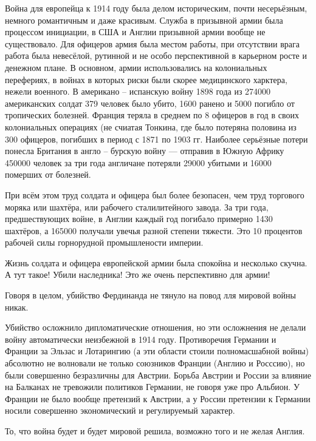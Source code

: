 Война для европейца к 1914 году была делом историческим, почти несерьёзным,
немного романтичным и даже красивым. Служба в призывной армии была процессом
инициации, в США и Англии призывной армии вообще не существовало. Для офицеров
армия была местом работы, при отсутствии врага работа была невесёлой, рутинной
и не особо перспективной в карьерном росте и денежном плане. В основном, армии
использовались на колониальных перефериях, в войнах в которых риски были скорее
медицинского харктера, нежели военного. В американо -- испанскую войну 1898 года
из 274000 американских солдат 379 человек было убито, 1600 ранено и 5000 погибло
от тропических болезней. Франция теряла в среднем по 8 офицеров в год в своих
колониальных операциях (не счиатая Тонкина, где было потеряна половина из 300
офицеров, погибших в период с 1871 по 1903 гг. Наиболее серьёзные потери понесла
Британия в англо -- бурскую войну --- отправив в Южную Африку 450000 человек за
три года англичане потеряли 29000 убитыми и 16000 померших от болезней.

При всём этом труд солдата и офицера был более безопасен, чем труд торгового
моряка или шахтёра, или рабочего сталилитейного завода. За три года,
предшествующих войне, в Англии каждый год погибало примерно 1430 шахтёров, а
165000 получали увечья разной степени тяжести. Это 10 процентов рабочей силы
горнорудной промышлености империи.

Жизнь солдата и офицера европейской армии была спокойна и несколько скучна. А
тут такое! Убили наследника! Это же очень перспективно для армии!

Говоря в целом, убийство Фердинанда не тянуло на повод лля мировой войны никак.

Убийство осложнило дипломатические отношения, но эти осложнения не делали войну
автоматически неизбежной в 1914 году. Противоречия Германии и Франции за Эльзас
и Лотарингию (а эти области стоили полномасшабной войны) абсолютно не волновали
не только союзников Франции (Англию и Росссию), но были совершенно безразличны
для Австрии. Борьба Австрии и России за влияние на Балканах не тревожили
политиков Германии, не говоря уже про Альбион. У Франции не было вообще
претензий к Австрии, а у России претензии к Германии носили совершенно
экономический и регулируемый характер.

То, что война будет и будет мировой решила, возможно того и не желая Англия.


